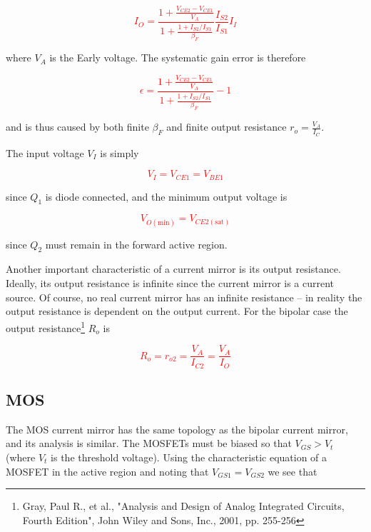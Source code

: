 \textcolor{red}{
\begin{equation}
I_{O} = \frac{1+\frac{V_{CE2}-V_{CE1}}{V_{A}}}{1+\frac{1+I_{S2}/I_{S1}}{\beta_{F}}}\frac{I_{S2}}{I_{S1}}I_{I}
\label{eq:fullsimplecurrentmirror}
\end{equation}
}

where $V_{A}$ is the Early voltage. The systematic gain error is therefore

\textcolor{red}{
\begin{equation}
\epsilon = \frac{1+\frac{V_{CE2}-V_{CE1}}{V_{A}}}{1+\frac{1+I_{S2}/I_{S1}}{\beta_{F}}}-1
\label{eq:simplecurrentmirror_sysgainerr}
\end{equation}
}

and is thus caused by both finite $\beta_{F}$ and finite output resistance $r_{o} = \frac{V_{A}}{I_{C}}$.
\par
The input voltage $V_{I}$ is simply

\textcolor{red}{
\begin{equation}
V_{I} = V_{CE1} = V_{BE1}
\label{eq:simplecurrentmirror_Vi}
\end{equation}
}

since $Q_{1}$ is diode connected, and the minimum output voltage is

\textcolor{red}{
\begin{equation}
V_{O(\text{min})} = V_{CE2(\text{sat})}
\label{eq:simplecurrentmirror_Vo}
\end{equation}
}

since $Q_{2}$ must remain in the forward active region.
\par Another important characteristic of a current mirror is its output resistance. Ideally, its output resistance is infinite since the current mirror is a current source. Of course, no real current mirror has an infinite resistance -- in reality the output resistance is dependent on the output current. For the bipolar case the output resistance\footnote{Gray, Paul R., et al., "Analysis and Design of Analog Integrated Circuits, Fourth Edition", John Wiley and Sons, Inc., 2001, pp. 255-256} $R_{o}$ is

\textcolor{red}{
\begin{equation}
R_{o} = r_{o2} = \frac{V_{A}}{I_{C2}} = \frac{V_{A}}{I_{O}}
\label{eq:simplecurrentmirror_Ro}
\end{equation}
}

\subsection{MOS}
The MOS current mirror has the same topology as the bipolar current mirror, and its analysis is similar. The MOSFETs must be biased so that $V_{GS} > V_{t}$ (where $V_{t}$ is the threshold voltage). Using the characteristic equation of a MOSFET in the active region and noting that $V_{GS1} = V_{GS2}$ we see that

